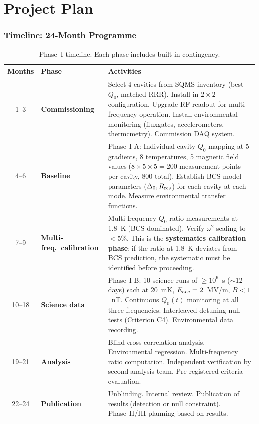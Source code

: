 \documentclass[11pt]{article}
\begin{document}
\part{Project Plan}

\section{Timeline: 24-Month Programme}
\label{sec:timeline}

\begin{table}[H]
\centering
\caption{Phase~I timeline. Each phase includes built-in contingency.}
\label{tab:timeline}
\renewcommand{\arraystretch}{1.3}
\begin{tabular}{@{}clp{8cm}@{}}
\toprule
\textbf{Months} & \textbf{Phase} & \textbf{Activities} \\
\midrule
1--3 & \textbf{Commissioning} &
  Select 4 cavities from SQMS inventory (best $Q_0$, matched RRR).
  Install in $2\times 2$ configuration. Upgrade RF readout for
  multi-frequency operation. Install environmental monitoring
  (fluxgates, accelerometers, thermometry). Commission DAQ system. \\
\midrule
4--6 & \textbf{Baseline} &
  Phase~I-A: Individual cavity $Q_0$ mapping at 5 gradients, 8
  temperatures, 5 magnetic field values ($8\times 5\times 5 = 200$
  measurement points per cavity, 800 total). Establish BCS model
  parameters ($\Delta_0, R_{\rm res}$) for each cavity at each mode.
  Measure environmental transfer functions. \\
\midrule
7--9 & \textbf{Multi-freq.\ calibration} &
  Multi-frequency $Q_0$ ratio measurements at 1.8~K (BCS-dominated).
  Verify $\omega^2$ scaling to $<$5\%. This is the \textbf{systematics
  calibration phase}: if the ratio at 1.8~K deviates from BCS
  prediction, the systematic must be identified before proceeding. \\
\midrule
10--18 & \textbf{Science data} &
  Phase~I-B: 10 science runs of $\geq 10^6$~s ($\sim$12 days) each at
  20~mK, $E_{\rm acc} = 2$~MV/m, $B < 1$~nT. Continuous $Q_0(t)$
  monitoring at all three frequencies. Interleaved detuning null tests
  (Criterion C4). Environmental data recording. \\
\midrule
19--21 & \textbf{Analysis} &
  Blind cross-correlation analysis. Environmental regression.
  Multi-frequency ratio computation. Independent verification by
  second analysis team. Pre-registered criteria evaluation. \\
\midrule
22--24 & \textbf{Publication} &
  Unblinding. Internal review. Publication of results (detection or
  null constraint). Phase~II/III planning based on results. \\
\bottomrule
\end{tabular}
\end{table}
\end{document}
